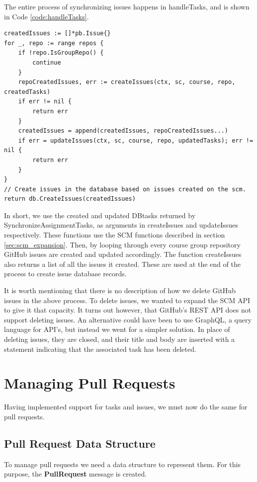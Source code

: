 The entire process of synchronizing issues happens in handleTasks, and is shown in Code \ref{code:handleTasks}.
\begin{lstlisting}[caption={Issue synchronization performed by handleTasks}, language=Golang, label={code:handleTasks}]
createdIssues := []*pb.Issue{}
for _, repo := range repos {
	if !repo.IsGroupRepo() {
		continue
	}
	repoCreatedIssues, err := createIssues(ctx, sc, course, repo, createdTasks)
	if err != nil {
		return err
	}
	createdIssues = append(createdIssues, repoCreatedIssues...)
	if err = updateIssues(ctx, sc, course, repo, updatedTasks); err != nil {
		return err
	}
}
// Create issues in the database based on issues created on the scm.
return db.CreateIssues(createdIssues)
\end{lstlisting}

In short, we use the created and updated DBtasks returned by SynchronizeAssignmentTasks, as arguments in createIssues and updateIssues respectively.
These functions use the SCM functions described in section \ref{sec:scm_expansion}.
Then, by looping through every course group repository GitHub issues are created and updated accordingly.
The function createIssues also returns a list of all the issues it created.
These are used at the end of the process to create issue database records.

It is worth mentioning that there is no description of how we delete GitHub issues in the above process.
To delete issues, we wanted to expand the SCM API to give it that capacity.
It turns out however, that GitHub's REST API does not support deleting issues.
An alternative could have been to use GraphQL, a query language for API's, but instead we went for a simpler solution.
In place of deleting issues, they are closed, and their title and body are inserted with a statement indicating that the associated task has been deleted.

\section{Managing Pull Requests}

Having implemented support for tasks and issues, we must now do the same for pull requests.

\subsection{Pull Request Data Structure}
\label{sec:pull-request-data-structure}

To manage pull requests we need a data structure to represent them.
For this purpose, the \textbf{PullRequest} message is created.


